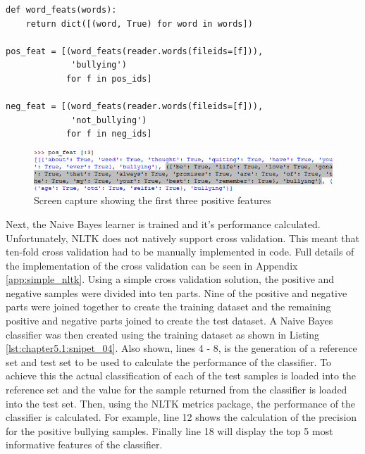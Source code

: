 \begin{lstlisting}[caption={Generation of the positive and negative feature dictionaries},label=lst:chapter5.1:snipet_03]
def word_feats(words):
    return dict([(word, True) for word in words])

pos_feat = [(word_feats(reader.words(fileids=[f])),
             'bullying')
            for f in pos_ids]

neg_feat = [(word_feats(reader.words(fileids=[f])),
             'not_bullying')
            for f in neg_ids]
\end{lstlisting}

\begin{figure}[htbp]
	\centering
	\includegraphics[width=1\textwidth]{Figures/Chapter5/pos_feat.jpg}
	\caption[Sample positive features]{Screen capture showing the first three positive features}
	\label{fig:chapter5:pos_feat}
\end{figure}

Next, the Naive Bayes learner is trained and it's performance calculated. Unfortunately, NLTK does not natively support cross validation. This meant that ten-fold cross validation had to be manually implemented in code. Full details of the implementation of the cross validation can be seen in Appendix \ref{app:simple_nltk}. Using a simple cross validation solution, the positive and negative samples were divided into ten parts. Nine of the positive and negative parts were joined together to create the training dataset and the remaining positive and negative parts joined to create the test dataset. A Naive Bayes classifier was then created using the training dataset as shown in Listing \ref{lst:chapter5.1:snipet_04}. Also shown, lines 4 - 8, is the generation of a reference set and test set to be used to calculate the performance of the classifier. To achieve this the actual classification of each of the test samples is loaded into the reference set and the value for the sample returned from the classifier is loaded into the test set. Then, using the NLTK metrics package, the performance of the classifier is calculated. For example, line 12 shows the calculation of the precision for the positive bullying samples. Finally line 18 will display the top 5 most informative features of the classifier.

